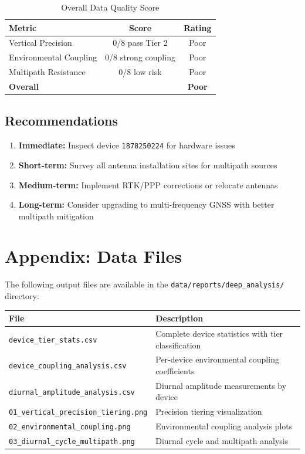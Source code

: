 \documentclass[11pt,a4paper]{article}
\begin{document}
\begin{table}[H]
\centering
\caption{Overall Data Quality Score}
\begin{tabular}{lcc}
\toprule
\textbf{Metric} & \textbf{Score} & \textbf{Rating} \\
\midrule
Vertical Precision & 0/8 pass Tier 2 & \textcolor{tier3}{Poor} \\
Environmental Coupling & 0/8 strong coupling & \textcolor{tier3}{Poor} \\
Multipath Resistance & 0/8 low risk & \textcolor{tier3}{Poor} \\
\midrule
\textbf{Overall} & & \textcolor{tier3}{\textbf{Poor}} \\
\bottomrule
\end{tabular}
\end{table}

\subsection{Recommendations}

\begin{enumerate}
    \item \textbf{Immediate:} Inspect device \texttt{1878250224} for hardware issues
    \item \textbf{Short-term:} Survey all antenna installation sites for multipath sources
    \item \textbf{Medium-term:} Implement RTK/PPP corrections or relocate antennas
    \item \textbf{Long-term:} Consider upgrading to multi-frequency GNSS with better multipath mitigation
\end{enumerate}

\newpage

\appendix
\section{Appendix: Data Files}

The following output files are available in the \texttt{data/reports/deep\_analysis/} directory:

\begin{table}[H]
\centering
\begin{tabular}{ll}
\toprule
\textbf{File} & \textbf{Description} \\
\midrule
\texttt{device\_tier\_stats.csv} & Complete device statistics with tier classification \\
\texttt{device\_coupling\_analysis.csv} & Per-device environmental coupling coefficients \\
\texttt{diurnal\_amplitude\_analysis.csv} & Diurnal amplitude measurements by device \\
\texttt{01\_vertical\_precision\_tiering.png} & Precision tiering visualization \\
\texttt{02\_environmental\_coupling.png} & Environmental coupling analysis plots \\
\texttt{03\_diurnal\_cycle\_multipath.png} & Diurnal cycle and multipath analysis \\
\bottomrule
\end{tabular}
\end{table}
\end{document}
